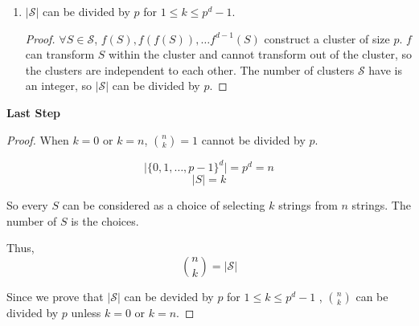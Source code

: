 \begin{enumerate}
\begin{proof}
        Thus, $f^{p-(p-1)t}(S) = S$. Since $t$ is the smallest, $t \leq p-(p-1)t$, $pt \leq p$, which contradicts $t > 1$.

        Therefore, $Period$ of $S$ is $p$. $S, f(S), \dots, f^{p-1}(S)$ are all different.
    \end{proof}

   \item $|\mathcal{S}|$ can be divided by $p$ for $1 \leq k \leq p^d - 1$.
   \begin{proof}
   $\forall S \in \mathcal{S}$, $f(S), f(f(S)), \dots f^{d-1}(S)$ construct a cluster of size $p$. $f$ can transform $S$ within the cluster and cannot transform out of the cluster, so the clusters are independent to each other. The number of clusters $\mathcal{S}$ have is an integer, so $\lvert \mathcal{S} \rvert$ can be divided by $p$.
   \end{proof}
   \end{enumerate}

   \textbf{Last Step}

\begin{proof}
When $k=0$ or $k=n$, ${n \choose k} = 1$ cannot be divided by $p$.

$$ \lvert \{0, 1, \dots, p-1\}^d \rvert = p^d = n $$
$$ \lvert S \rvert = k $$ 

So every $ S $ can be considered as a choice of selecting $k$ strings from $n$ strings. The number of $S$ is the choices.

Thus, $${n \choose k} = \lvert \mathcal{S} \rvert$$ 

Since we prove that $\lvert \mathcal{S} \rvert$ can be devided by $p$ for $1 \leq k \leq p^d - 1$ , ${n \choose k}$ can be divided by $p$ unless $k=0$ or $k=n$.
\end{proof}


